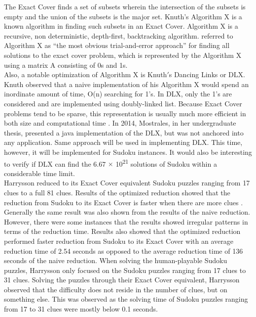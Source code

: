 \documentclass[a4paper,oneside,11pt]{report}
\begin{document}
The Exact Cover finds a set of subsets wherein the intersection of the subsets is empty and the union of the subsets is the major set. Knuth$’$s Algorithm X is a known algorithm in finding such subsets in an Exact Cover. Algorithm X is a recursive, non deterministic, depth-first, backtracking algorithm. \cite{Knuth} referred to Algorithm X as “the most obvious trial-and-error approach” for finding all solutions to the exact cover problem, which is represented by the Algorithm X using  a matrix A consisting of 0s and 1s.\\

Also, a notable optimization of Algorithm X is Knuth$'$s Dancing Links or DLX. Knuth observed that a naive implementation of his Algorithm X would spend an inordinate amount of time, O(n) searching for 1’s. In DLX, only the 1’s are considered and are implemented using doubly-linked list. Because Exact Cover problems tend to be sparse, this representation is usually much more efficient in both size and computational time \cite{Dahlke}. In 2014, Mostrales, in her undergraduate thesis, presented a java implementation of the DLX, but was not anchored into any application. Same approach will be used in implementing DLX. This time, however, it will be implemented for Sudoku instances. It would also be interesting to verify if DLX can find the 6.67 $\times$ 10\textsuperscript{21} solutions of Sudoku within a considerable time limit.\\

Harrysson reduced to its Exact Cover equivalent Sudoku puzzles ranging from 17 clues to a full 81 clues. Results of the  optimized reduction showed that the reduction from Sudoku to its Exact Cover is faster when there are more clues \cite{Harrysson}. Generally the same result was also shown from the results of the naive reduction. However, there were some instances that the results showed irregular patterns in terms of the reduction time. Results also showed that the optimized reduction performed faster reduction from Sudoku to its Exact Cover with an average reduction time of 2.54 seconds as opposed to the average reduction time of 136 seconds of the naive reduction. When solving the human-playable Sudoku puzzles, Harrysson only focused on the Sudoku puzzles ranging from 17 clues to 31 clues. Solving the puzzles through their Exact Cover equivalent, Harrysson observed that the difficulty does not reside in the number of clues, but on something else. This was observed as the solving time of Sudoku puzzles ranging from 17 to 31 clues were mostly below 0.1 seconds.\\
\end{document}
